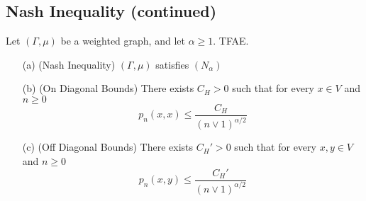\documentclass[main]{subfiles}
\begin{document}


\subsection*{Nash Inequality (continued)}
\begin{theorem}
	Let $(\Gamma, \mu)$ be a weighted graph, and let $\alpha\ge1$. TFAE.
	\begin{itemize}
		\item[(a)](Nash Inequality) $(\Gamma, \mu)$ satisfies $(N_{\alpha})$
		\item[(b)](On Diagonal Bounds) There exists $C_H>0 $ such that for every $x\in V$ and $n\ge0$ \[p_n(x,x)\le\frac{C_H}{(n\lor 1)^{\alpha/2}}\]
		\item[(c)](Off Diagonal Bounds) There exists $C_H'>0 $ such that for every $x,y\in V$ and $n\ge0$ \[p_n(x,y)\le\frac{C_H'}{(n\lor 1)^{\alpha/2}}\]
	\end{itemize}
\end{theorem}
\end{document}

